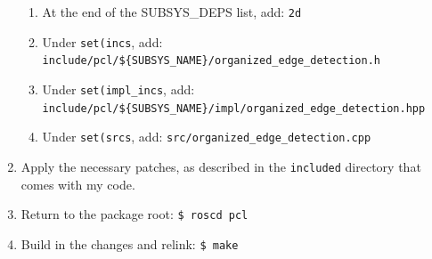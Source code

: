\documentclass[12pt]{report}
\begin{document}
\begin{sloppypar}
\begin{enumerate}
\begin{enumerate}
\item{At the end of the SUBSYS\_DEPS list, add: \texttt{2d}}
\item{Under \texttt{set(incs}, add: \texttt{include\slash pcl\slash \$\{SUBSYS\_NAME\}\slash organized\_edge\_detection.h}}
\item{Under \texttt{set(impl\_incs}, add: \texttt{include\slash pcl\slash \$\{SUBSYS\_NAME\}\slash impl\slash organized\_edge\_detection.hpp}}
\item{Under \texttt{set(srcs}, add: \texttt{src/organized\_edge\_detection.cpp}}
\end{enumerate}
\item{Apply the necessary patches, as described in the \texttt{included} directory that comes with my code.}
\item{Return to the package root: \texttt{\$\ roscd pcl}}
\item{Build in the changes and relink: \texttt{\$\ make}}
\end{enumerate}
\end{sloppypar}
\end{document}
